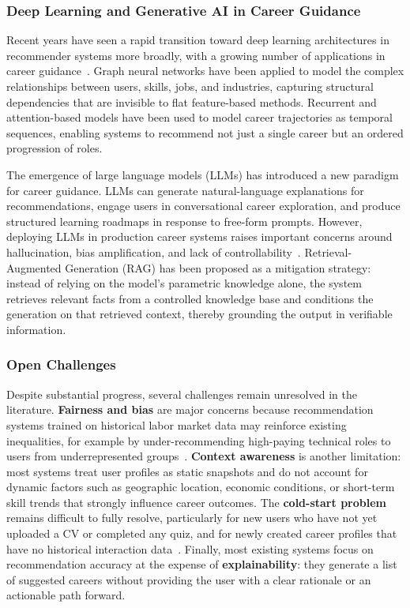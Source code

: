 \documentclass[12pt,a4paper]{article}
\begin{document}
\subsubsection*{Deep Learning and Generative AI in Career Guidance}

Recent years have seen a rapid transition toward deep learning architectures in recommender systems more broadly, with a growing number of applications in career guidance~\cite{jobrec_arxiv2021}. Graph neural networks have been applied to model the complex relationships between users, skills, jobs, and industries, capturing structural dependencies that are invisible to flat feature-based methods. Recurrent and attention-based models have been used to model career trajectories as temporal sequences, enabling systems to recommend not just a single career but an ordered progression of roles.

The emergence of large language models (LLMs) has introduced a new paradigm for career guidance. LLMs can generate natural-language explanations for recommendations, engage users in conversational career exploration, and produce structured learning roadmaps in response to free-form prompts. However, deploying LLMs in production career systems raises important concerns around hallucination, bias amplification, and lack of controllability~\cite{springer2022job}. Retrieval-Augmented Generation (RAG) has been proposed as a mitigation strategy: instead of relying on the model's parametric knowledge alone, the system retrieves relevant facts from a controlled knowledge base and conditions the generation on that retrieved context, thereby grounding the output in verifiable information.

\subsubsection*{Open Challenges}

Despite substantial progress, several challenges remain unresolved in the literature. \textbf{Fairness and bias} are major concerns because recommendation systems trained on historical labor market data may reinforce existing inequalities, for example by under-recommending high-paying technical roles to users from underrepresented groups~\cite{springer2022job}. \textbf{Context awareness} is another limitation: most systems treat user profiles as static snapshots and do not account for dynamic factors such as geographic location, economic conditions, or short-term skill trends that strongly influence career outcomes. The \textbf{cold-start problem} remains difficult to fully resolve, particularly for new users who have not yet uploaded a CV or completed any quiz, and for newly created career profiles that have no historical interaction data~\cite{springer2022job}. Finally, most existing systems focus on recommendation accuracy at the expense of \textbf{explainability}: they generate a list of suggested careers without providing the user with a clear rationale or an actionable path forward.
\end{document}
